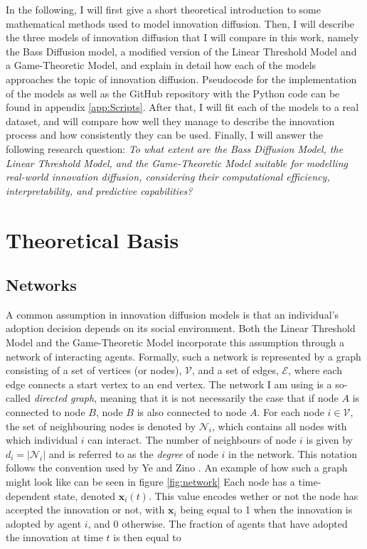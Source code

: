 \documentclass[11pt]{article}
\begin{document}
	In the following, I will first give a short theoretical introduction to some mathematical methods used to model innovation diffusion. Then, I will describe the three models of innovation diffusion that I will compare in this work, namely the Bass Diffusion model, a modified version of the Linear Threshold Model and a Game-Theoretic Model, and explain in detail how each of the models approaches the topic of innovation diffusion. Pseudocode for the implementation of the models as well as the GitHub repository with the Python code can be found in appendix \ref{app:Scripts}. After that, I will fit each of the models to a real dataset, and will compare how well they manage to describe the innovation process and how consistently they can be used.
	Finally, I will answer the following research question:
	\textit{To what extent are the Bass Diffusion Model, the Linear Threshold Model, and the Game-Theoretic Model suitable for modelling real-world innovation diffusion, considering their computational efficiency, interpretability, and predictive capabilities?} 
	
	\section{Theoretical Basis}
	\subsection{Networks} \label{sec:NetworksBasis}
	A common assumption in innovation diffusion models is that an individual’s adoption decision depends on its social environment. Both the Linear Threshold Model and the Game-Theoretic Model incorporate this assumption through a network of interacting agents. Formally, such a network is represented by a graph consisting of a set of vertices (or nodes), $\mathcal{V}$, and a set of edges, $\mathcal{E}$, where each edge connects a start vertex to an end vertex. The network I am using is a so-called \textit{directed graph}, meaning that it is not necessarily the case that if node $A$ is connected to node $B$, node $B$ is also connected to node $A$. For each node $i \in \mathcal{V}$, the set of neighbouring nodes is denoted by $\mathcal{N}_i$, which contains all nodes with which individual $i$ can interact. The number of neighbours of node $i$ is given by $d_i = |\mathcal{N}_i|$ and is referred to as the \textit{degree} of node $i$ in the network. This notation follows the convention used by Ye and Zino \autocite{Ye24}. An example of how such a graph might look like can be seen in figure \ref{fig:network} Each node has a time-dependent state, denoted $\mathbf{x}_i(t)$. This value encodes wether or not the node has accepted the innovation or not, with $\mathbf{x}_i$ being equal to 1 when the innovation is adopted by agent $i$, and 0 otherwise. The fraction of agents that have adopted the innovation at time $t$ is then equal to
	
\end{document}
